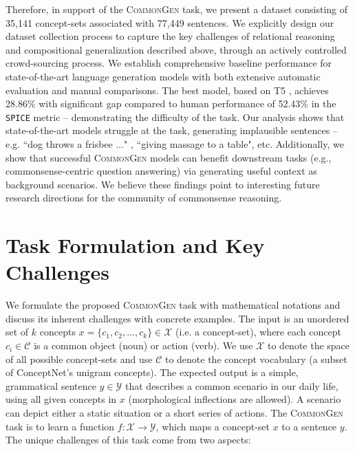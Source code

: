 \documentclass[11pt,a4paper]{article}
\begin{document}
Therefore, in support of the \textsc{CommonGen} task, we present a dataset consisting of 35,141 concept-sets associated with 77,449 sentences.
We explicitly design our dataset collection process to capture the key challenges of relational reasoning and compositional generalization described above, through an actively controlled crowd-sourcing process.
We establish comprehensive baseline performance for state-of-the-art language generation models with both extensive automatic evaluation and manual comparisons. The best model, based on T5 \cite{raffel2019exploring}, achieves 28.86\% with significant gap compared to human performance of 52.43\% in the \texttt{SPICE} metric -- demonstrating the difficulty of the task.
Our analysis shows that state-of-the-art models struggle at the task, generating implausible sentences -- e.g. ``dog throws a frisbee ..." , ``giving massage to a table", etc. 
Additionally,
we show that successful \textsc{CommonGen} models can benefit downstream tasks (e.g., commonsense-centric question answering) via generating useful context as background scenarios.
We believe these findings point to interesting future research directions for the community of commonsense reasoning. 






	 
	
	\section{Task Formulation and Key Challenges}
	\label{sec:formualtion}
	We formulate the proposed \textsc{CommonGen} task with mathematical notations and discuss its inherent challenges with concrete examples. 
	The input is an unordered set of $k$ concepts $x=\{c_1,c_2,\dots,c_k\}\in \mathcal{X}$ (i.e. a concept-set), where each concept $c_i\in \mathcal{C}$ is a common object (noun) or action (verb). 
	We use $\mathcal{X}$ to denote the space of all possible concept-sets and use $\mathcal{C}$ to denote the concept vocabulary (a subset of ConceptNet's unigram concepts).
	The expected output is a simple, grammatical sentence $y\in\mathcal{Y}$ that describes a common scenario in our daily life, using  all given concepts in $x$ (morphological inflections are allowed).
	A scenario can depict either a static situation or a short series of actions.
The \textsc{CommonGen} task is to learn a function $f:
	\mathcal{X} \rightarrow \mathcal{Y}$, which maps a concept-set $x$ to a sentence $y$. 
The unique challenges of this task come from two aspects:
	
\end{document}
